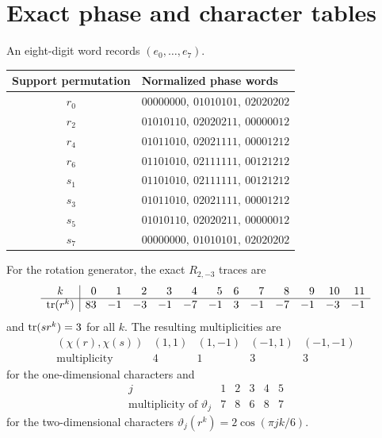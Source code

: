 \section{Exact phase and character tables}
\label{app:tables}

An eight-digit word records \((e_0,\ldots,e_7)\).

\begin{center}
\small
\begin{tabular}{@{}cl@{}}
\toprule
Support permutation & Normalized phase words\\
\midrule
\(r_0\) & \(00000000,\ 01010101,\ 02020202\)\\
\(r_2\) & \(01010110,\ 02020211,\ 00000012\)\\
\(r_4\) & \(01011010,\ 02021111,\ 00001212\)\\
\(r_6\) & \(01101010,\ 02111111,\ 00121212\)\\
\(s_1\) & \(01101010,\ 02111111,\ 00121212\)\\
\(s_3\) & \(01011010,\ 02021111,\ 00001212\)\\
\(s_5\) & \(01010110,\ 02020211,\ 00000012\)\\
\(s_7\) & \(00000000,\ 01010101,\ 02020202\)\\
\bottomrule
\end{tabular}
\end{center}

For the rotation generator, the exact \(R_{2,-3}\) traces are
\[
\begin{array}{c|rrrrrrrrrrrr}
k&0&1&2&3&4&5&6&7&8&9&10&11\\
\hline
\operatorname{tr}(r^k)&83&-1&-3&-1&-7&-1&3&-1&-7&-1&-3&-1
\end{array}
\]
and \(\operatorname{tr}(sr^k)=3\) for all \(k\).  The resulting multiplicities are
\[
\begin{array}{c|rrrr}
(\chi(r),\chi(s))&(1,1)&(1,-1)&(-1,1)&(-1,-1)\\
\hline
\text{multiplicity}&4&1&3&3
\end{array}
\]
for the one-dimensional characters and
\[
\begin{array}{c|rrrrr}
j&1&2&3&4&5\\
\hline
\text{multiplicity of }\vartheta_j&7&8&6&8&7
\end{array}
\]
for the two-dimensional characters
\(\vartheta_j(r^k)=2\cos(\pi jk/6)\).
